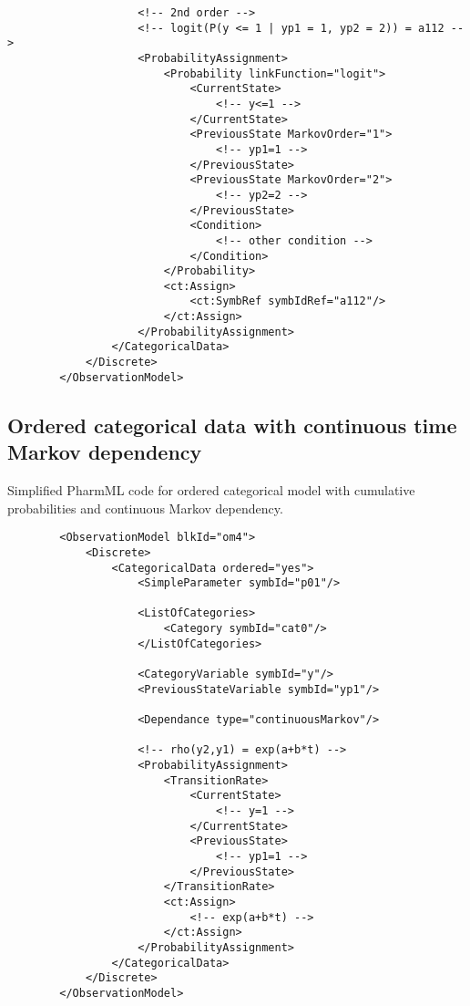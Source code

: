 \begin{lstlisting}
                    <!-- 2nd order -->
                    <!-- logit(P(y <= 1 | yp1 = 1, yp2 = 2)) = a112 -->
                    <ProbabilityAssignment>
                        <Probability linkFunction="logit">
                            <CurrentState>
                                <!-- y<=1 -->
                            </CurrentState>
                            <PreviousState MarkovOrder="1">
                                <!-- yp1=1 -->
                            </PreviousState>
                            <PreviousState MarkovOrder="2">
                                <!-- yp2=2 -->
                            </PreviousState>
                            <Condition>
                                <!-- other condition -->
                            </Condition>
                        </Probability>
                        <ct:Assign>
                            <ct:SymbRef symbIdRef="a112"/>
                        </ct:Assign>
                    </ProbabilityAssignment>
                </CategoricalData>
            </Discrete>
        </ObservationModel>
\end{lstlisting}

\subsection{Ordered categorical data with continuous time Markov dependency}
Simplified PharmML code for ordered categorical model with cumulative probabilities 
and continuous Markov dependency.
\lstset{language=XML}
\begin{lstlisting}
        <ObservationModel blkId="om4">
            <Discrete>
                <CategoricalData ordered="yes">
                    <SimpleParameter symbId="p01"/>
                    
                    <ListOfCategories>
                        <Category symbId="cat0"/>
                    </ListOfCategories>
                    
                    <CategoryVariable symbId="y"/>
                    <PreviousStateVariable symbId="yp1"/>
                    
                    <Dependance type="continuousMarkov"/>
                    
                    <!-- rho(y2,y1) = exp(a+b*t) -->
                    <ProbabilityAssignment>
                        <TransitionRate>
                            <CurrentState>
                                <!-- y=1 -->
                            </CurrentState>
                            <PreviousState>
                                <!-- yp1=1 -->
                            </PreviousState>
                        </TransitionRate>
                        <ct:Assign>
                            <!-- exp(a+b*t) -->
                        </ct:Assign>
                    </ProbabilityAssignment>
                </CategoricalData>
            </Discrete>
        </ObservationModel>
\end{lstlisting}

